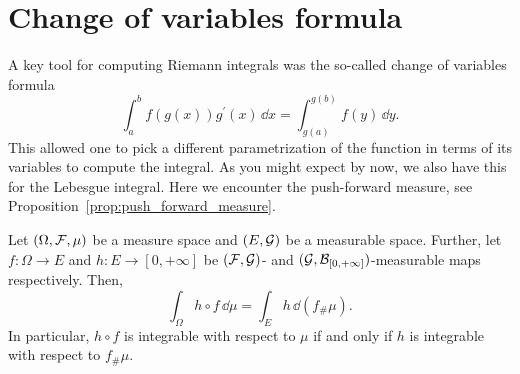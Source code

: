 \section{Change of variables formula}
\label{sec:change-of-variables}

A key tool for computing Riemann integrals was the so-called change of variables formula 
\[
	\int_a^b f(g(x)) g^\prime(x) \, \dd x = \int_{g(a)}^{g(b)} f(y) \, \dd y.
\]
This allowed one to pick a different parametrization of the function in terms of its variables to compute the integral. As you might expect by now, we also have this for the Lebesgue integral. Here we encounter the push-forward measure, see Proposition~\ref{prop:push_forward_measure}.


\begin{proposition}\label{prop:change_of_variables}
Let $(\Omega, \mathcal F, \mu)$ be a measure space and $(E,\mathcal G)$ be a measurable space. Further, let $f\colon \Omega \to E$ and $h\colon E \to [0,+\infty]$ be $(\mathcal F,\mathcal G)$- and $(\mathcal G,\mathcal B_{[0,+\infty]})$-measurable maps respectively. Then,
\[
\int_\Omega h \circ f\,\dd \mu = \int_E h \, \dd (f_\# \mu).
\]
In particular, $h \circ f$ is integrable with respect to $\mu$ if and only if $h$ is integrable with respect to $f_\# \mu$.
\end{proposition}

